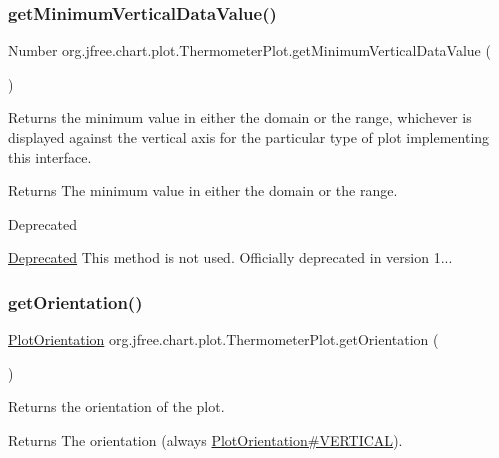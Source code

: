 \subsubsection{\texorpdfstring{get\+Minimum\+Vertical\+Data\+Value()}{getMinimumVerticalDataValue()}}
{\footnotesize\ttfamily Number org.\+jfree.\+chart.\+plot.\+Thermometer\+Plot.\+get\+Minimum\+Vertical\+Data\+Value (\begin{DoxyParamCaption}{ }\end{DoxyParamCaption})}

Returns the minimum value in either the domain or the range, whichever is displayed against the vertical axis for the particular type of plot implementing this interface.

\begin{DoxyReturn}{Returns}
The minimum value in either the domain or the range.
\end{DoxyReturn}
\begin{DoxyRefDesc}{Deprecated}
\item[\mbox{\hyperlink{deprecated__deprecated000094}{Deprecated}}]This method is not used. Officially deprecated in version 1... \end{DoxyRefDesc}
\mbox{\label{classorg_1_1jfree_1_1chart_1_1plot_1_1_thermometer_plot_a12bb9968d853a440fd272506f58d83db}} 
\subsubsection{\texorpdfstring{get\+Orientation()}{getOrientation()}}
{\footnotesize\ttfamily \mbox{\hyperlink{classorg_1_1jfree_1_1chart_1_1plot_1_1_plot_orientation}{Plot\+Orientation}} org.\+jfree.\+chart.\+plot.\+Thermometer\+Plot.\+get\+Orientation (\begin{DoxyParamCaption}{ }\end{DoxyParamCaption})}

Returns the orientation of the plot.

\begin{DoxyReturn}{Returns}
The orientation (always \mbox{\hyperlink{classorg_1_1jfree_1_1chart_1_1plot_1_1_plot_orientation_a2b064227b679130eb0b5e3ac022e5371}{Plot\+Orientation\#\+V\+E\+R\+T\+I\+C\+AL}}). 
\end{DoxyReturn}


